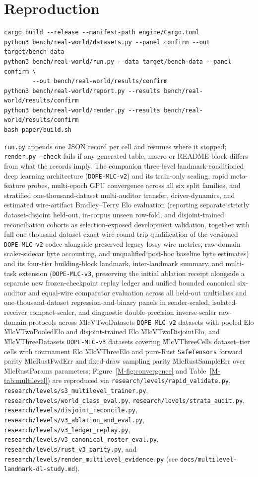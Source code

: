 \documentclass[10pt,letterpaper]{article}
\begin{document}
\section{Reproduction}
\label{app:repro}

\begin{verbatim}
cargo build --release --manifest-path engine/Cargo.toml
python3 bench/real-world/datasets.py --panel confirm --out target/bench-data
python3 bench/real-world/run.py --data target/bench-data --panel confirm \
        --out bench/real-world/results/confirm
python3 bench/real-world/report.py --results bench/real-world/results/confirm
python3 bench/real-world/render.py --results bench/real-world/results/confirm
bash paper/build.sh
\end{verbatim}
\noindent
\texttt{run.py} appends one JSON record per cell and resumes where it stopped; \texttt{render.py --check}
fails if any generated table, macro or README block differs from what the records imply. The companion
three-level landmark-conditioned deep learning architecture (\texttt{DOPE-MLC-v2}) and its train-only
scaling, rapid meta-feature probes, multi-epoch GPU convergence across all six split families, and
stratified one-thousand-dataset multi-auditor transfer, driver-dynamics, and estimated wire-artifact
Bradley--Terry Elo evaluation (reporting separate strictly dataset-disjoint held-out, in-corpus unseen
row-fold, and disjoint-trained reconciliation cohorts as selection-exposed development validation,
together with full one-thousand-dataset exact wire round-trip qualification of the versioned
\texttt{DOPE-MLC-v2} codec alongside preserved legacy lossy wire metrics, raw-domain scaler-sidecar
byte accounting, and unqualified post-hoc baseline byte estimates) and its four-tier building-block
landmark, inter-landmark summary, and multi-task extension (\texttt{DOPE-MLC-v3}, preserving the
initial ablation receipt alongside a separate new frozen-checkpoint replay ledger and unified bounded
canonical six-auditor and equal-wire comparator evaluation across all held-out multiclass and
one-thousand-dataset regression-and-binary panels in sender-scaled, isolated-receiver compact-scaler,
and diagnostic double-precision inverse-scaler raw-domain protocols across \G{MlcVTwoDatasets}
\texttt{DOPE-MLC-v2} datasets with pooled Elo \G{MlcVTwoPooledElo} and disjoint-trained Elo
\G{MlcVTwoDisjointElo}, and \G{MlcVThreeDatasets} \texttt{DOPE-MLC-v3} datasets covering
\G{MlcVThreeCells} dataset--tier cells with tournament Elo \G{MlcVThreeElo} and pure-Rust
\texttt{SafeTensors} forward parity \G{MlcRustFwdErr} and fixed-draw sampling parity
\G{MlcRustSampleErr} over \G{MlcRustParams} parameters; Figure~\ref{M-fig:convergence} and
Table~\ref{M-tab:multilevel}) are
reproduced via \texttt{research/levels/rapid\_validate.py},
\texttt{research/levels/s3\_multilevel\_trainer.py}, \texttt{research/levels/world\_class\_eval.py},
\texttt{research/levels/strata\_audit.py}, \texttt{research/levels/disjoint\_reconcile.py},
\texttt{research/levels/v3\_ablation\_and\_eval.py}, \texttt{research/levels/v3\_ledger\_replay.py},
\texttt{research/levels/v3\_canonical\_roster\_eval.py},
\texttt{research/levels/rust\_v3\_parity.py}, and
\texttt{research/levels/render\_multilevel\_evidence.py}
(see \texttt{docs/multilevel-landmark-dl-study.md}).



\end{document}
